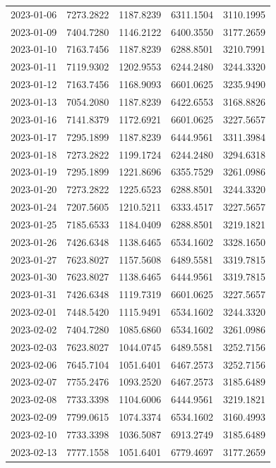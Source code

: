 {\begin{longtable}{lllll}
2023-01-06 & 7273.2822 & 1187.8239 & 6311.1504 & 3110.1995 \\
2023-01-09 & 7404.7280 & 1146.2122 & 6400.3550 & 3177.2659 \\
2023-01-10 & 7163.7456 & 1187.8239 & 6288.8501 & 3210.7991 \\
2023-01-11 & 7119.9302 & 1202.9553 & 6244.2480 & 3244.3320 \\
2023-01-12 & 7163.7456 & 1168.9093 & 6601.0625 & 3235.9490 \\
2023-01-13 & 7054.2080 & 1187.8239 & 6422.6553 & 3168.8826 \\
2023-01-16 & 7141.8379 & 1172.6921 & 6601.0625 & 3227.5657 \\
2023-01-17 & 7295.1899 & 1187.8239 & 6444.9561 & 3311.3984 \\
2023-01-18 & 7273.2822 & 1199.1724 & 6244.2480 & 3294.6318 \\
2023-01-19 & 7295.1899 & 1221.8696 & 6355.7529 & 3261.0986 \\
2023-01-20 & 7273.2822 & 1225.6523 & 6288.8501 & 3244.3320 \\
2023-01-24 & 7207.5605 & 1210.5211 & 6333.4517 & 3227.5657 \\
2023-01-25 & 7185.6533 & 1184.0409 & 6288.8501 & 3219.1821 \\
2023-01-26 & 7426.6348 & 1138.6465 & 6534.1602 & 3328.1650 \\
2023-01-27 & 7623.8027 & 1157.5608 & 6489.5581 & 3319.7815 \\
2023-01-30 & 7623.8027 & 1138.6465 & 6444.9561 & 3319.7815 \\
2023-01-31 & 7426.6348 & 1119.7319 & 6601.0625 & 3227.5657 \\
2023-02-01 & 7448.5420 & 1115.9491 & 6534.1602 & 3244.3320 \\
2023-02-02 & 7404.7280 & 1085.6860 & 6534.1602 & 3261.0986 \\
2023-02-03 & 7623.8027 & 1044.0745 & 6489.5581 & 3252.7156 \\
2023-02-06 & 7645.7104 & 1051.6401 & 6467.2573 & 3252.7156 \\
2023-02-07 & 7755.2476 & 1093.2520 & 6467.2573 & 3185.6489 \\
2023-02-08 & 7733.3398 & 1104.6006 & 6444.9561 & 3219.1821 \\
2023-02-09 & 7799.0615 & 1074.3374 & 6534.1602 & 3160.4993 \\
2023-02-10 & 7733.3398 & 1036.5087 & 6913.2749 & 3185.6489 \\
2023-02-13 & 7777.1558 & 1051.6401 & 6779.4697 & 3177.2659 \\

\end{longtable}}
